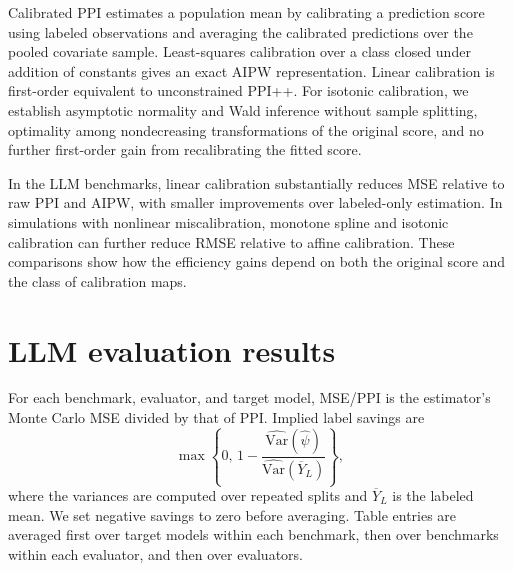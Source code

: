 \documentclass{article}
\theoremstyle{plain}
\theoremstyle{definition}
\newcommand{\Var}{\mathrm{Var}}
\newcommand{\1}{\mathbf{1}}
\begin{document}
Calibrated PPI estimates a population mean by calibrating a prediction score
using labeled observations and averaging the calibrated predictions over the
pooled covariate sample. Least-squares calibration over a class closed under
addition of constants gives an exact AIPW representation. Linear calibration
is first-order equivalent to unconstrained PPI++. For isotonic calibration,
we establish asymptotic normality and Wald inference without sample splitting,
optimality among nondecreasing transformations of the original score, and no
further first-order gain from recalibrating the fitted score.

In the LLM benchmarks, linear calibration substantially reduces MSE relative
to raw PPI and AIPW, with smaller improvements over labeled-only estimation.
In simulations with nonlinear miscalibration, monotone spline and isotonic
calibration can further reduce RMSE relative to affine calibration. These
comparisons show how the efficiency gains depend on both the original score
and the class of calibration maps.




\appendix

\section{LLM evaluation results}
\label{app:simresults}
For each benchmark, evaluator, and target model, MSE/PPI is the estimator's
Monte Carlo MSE divided by that of PPI. Implied label savings are
\[
\max\!\left\{0,\,
1-\frac{\widehat{\Var}(\widehat\psi)}{\widehat{\Var}(\overline Y_L)}
\right\},
\]
where the variances are computed over repeated splits and \(\overline Y_L\)
is the labeled mean. We set negative savings to zero before averaging.
Table entries are averaged first over target models within each benchmark,
then over benchmarks within each evaluator, and then over evaluators.

\end{document}
